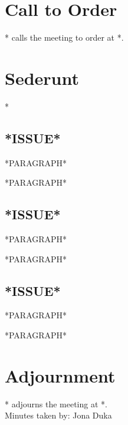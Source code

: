 \documentclass{compsocmeeting}
\begin{document}
\date{*DATE*}
\maketitle

\section{Call to Order}
* calls the meeting to order at *.

\section{Sederunt}
*

\subsection{*ISSUE*}
*PARAGRAPH*

*PARAGRAPH*

\action{*} 
\action{*} 

\subsection{*ISSUE*}
*PARAGRAPH*

*PARAGRAPH*

\action{*} 
\action{*} 

\subsection{*ISSUE*}
*PARAGRAPH*

*PARAGRAPH*

\action{*} 
\action{*} 

\section{Adjournment}
* adjourns the meeting at *. \\[1.5cm]
Minutes taken by: Jona Duka
\end{document}
